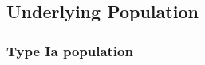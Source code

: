 \documentclass[a4paper,fleqn,usenatbib]{emulateapj}
\begin{document}




\subsection{Underlying Population}

\subsubsection{Type Ia population} 
\label{sec:underlying}
\end{document}
